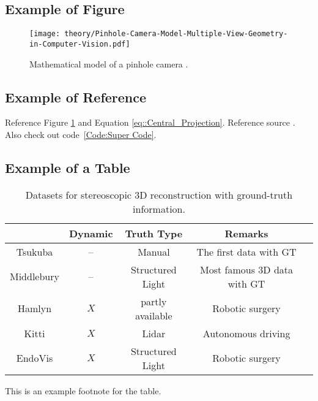 \documentclass[class=scrbook, crop=false]{standalone}
\begin{document}
    \subsection{Example of Figure}
    \begin{figure}[ht]
            \centering
            \texttt{[image: theory/Pinhole-Camera-Model-Multiple-View-Geometry-in-Computer-Vision.pdf]}
            \caption[Mathematical model of a pinhole camera]{Mathematical model of a pinhole camera \cite{Multiple_View_Geometry_in_Computer_Vision}.}
            \label{fig::Pinhole_Camera_Model}
        \end{figure}
    

    \subsection{Example of Reference}
    Reference Figure \ref{fig::Pinhole_Camera_Model} and Equation \ref{eq::Central_Projection}.
    Reference source \cite{3D_introductorytechniques}. Also check out code~\ref{Code:Super Code}.

    \subsection{Example of a Table}
    \begin{table*}[ht]
        \centering
        \caption[Datasets for 3D reconstruction]{Datasets for stereoscopic 3D reconstruction with ground-truth information.}
        \label{Table::Dataset_attributes}
        \begin{tabular}{|c|c|c|c|c|}
            \hline
            ~                        & Dynamic & Truth Type       & Remarks\\
            \hline
            \color{blue} Tsukuba      & --      & Manual           & The first data with GT\\
            \color{orange} Middlebury & --      & Structured Light & Most famous 3D data with GT \\
            \color{red} Hamlyn        & $X$     & partly available & Robotic surgery\\
            \color{cyan} Kitti        & $X$     & Lidar            & Autonomous driving\\
            \color{green} EndoVis     & $X$     & Structured Light & Robotic surgery\\
            \hline
        \end{tabular}
        \begin{tablenotes}
            \small
            \item * This is an example footnote for the table.
        \end{tablenotes}
    \end{table*}
\end{document}
